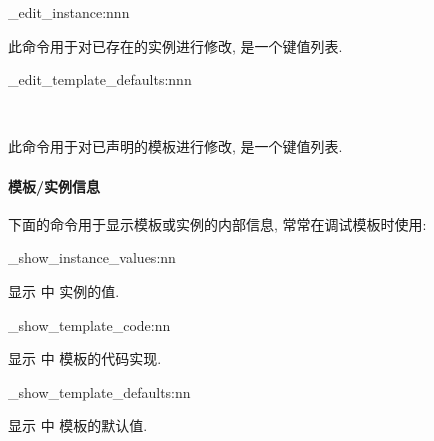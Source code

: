 \begin{function}[added=2025-09-17]{\ztex_edit_instance:nnn}
  \begin{syntax}
     
  \end{syntax}
  此命令用于对已存在的实例进行修改,  是一个键值列表.
\end{function}


\begin{function}[added=2025-09-17]{\ztex_edit_template_defaults:nnn}
  \begin{syntax}
    ~~~~
  \end{syntax}
  此命令用于对已声明的模板进行修改,  是一个键值列表.
\end{function}


\paragraph{模板/实例信息} 下面的命令用于显示模板或实例的内部信息, 常常在调试模板时使用:

\begin{function}[added=2025-09-20]{\ztex_show_instance_values:nn}
  \begin{syntax}
     
  \end{syntax}
  显示  中  实例的值.
\end{function}


\begin{function}[added=2025-09-20]{\ztex_show_template_code:nn}
  \begin{syntax}
     
  \end{syntax}
  显示  中  模板的代码实现.
\end{function}



\begin{function}[added=2025-09-20]{\ztex_show_template_defaults:nn}
  \begin{syntax}
     
  \end{syntax}
  显示  中  模板的默认值.
\end{function}



